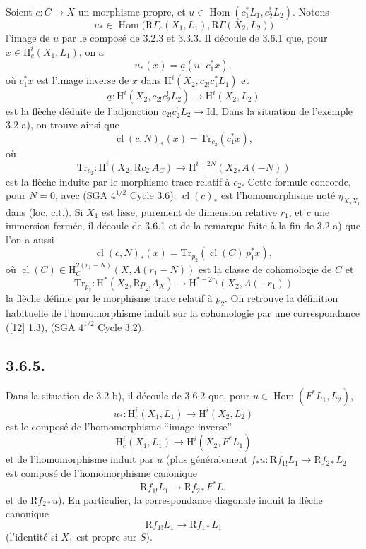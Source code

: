 \documentclass[11pt]{article}
\renewcommand{\H}{\mathrm{H}}
\DeclareMathOperator{\Hom}{Hom}
\newcommand{\R}{\mathrm{R}}\newcommand{\RHomCore}{\mathrm{RHom}}
\providecommand{\Id}{\mathrm{Id}}
\providecommand{\Hom}{\operatorname{Hom}}
\providecommand{\R}{\mathrm R}
\providecommand{\Hom}{\operatorname{Hom}}
\begin{document}
Soient $c:C\to X$ un morphisme propre, et $u\in\Hom(c_1^*L_1,c_2^!L_2)$. Notons
\[
u_*\in\Hom\bigl(\R\Gamma_c(X_1,L_1),\R\Gamma(X_2,L_2)\bigr)
\]
l'image de $u$ par le composé de 3.2.3 et 3.3.3. Il découle de 3.6.1 que, pour $x\in\H_c^i(X_1,L_1)$, on a
\begin{equation}
u_*(x)=\underline{a}(u\cdot c_1^*x),
\tag{3.6.2}
\end{equation}
où $c_1^*x$ est l'image inverse de $x$ dans $\H^i(X_2,c_{2!}c_1^*L_1)$ et
\[
\underline{a}:\H^i(X_2,c_{2!}c_2^!L_2)\longrightarrow \H^i(X_2,L_2)
\]
est la flèche déduite de l'adjonction $c_{2!}c_2^!L_2\to\Id$. Dans la situation de l'exemple 3.2 a), on trouve ainsi que
\begin{equation}
\operatorname{cl}(c,N)_*(x)=\mathrm{Tr}_{c_2}(c_1^*x),
\tag{3.6.3}
\end{equation}
où
\[
\mathrm{Tr}_{c_2}:\H^i(X_2,\R c_{2!}A_C)\longrightarrow\H^{i-2N}(X_2,A(-N))
\]
est la flèche
induite par le morphisme trace relatif à $c_2$. Cette formule concorde, pour $N=0$, avec (SGA $4^{1/2}$ Cycle 3.6): $\operatorname{cl}(c)_*$ est l'homomorphisme noté $\eta_{X_2X_1}$ dans (loc. cit.). Si $X_1$ est lisse, purement de dimension relative $r_1$, et $c$ une immersion fermée, il découle de 3.6.1 et de la remarque faite à la fin de 3.2 a) que l'on a aussi
\begin{equation}
\operatorname{cl}(c,N)_*(x)=\mathrm{Tr}_{p_2}(\operatorname{cl}(C)\,p_1^*x),
\tag{3.6.4}
\end{equation}
où $\operatorname{cl}(C)\in \H_C^{2(r_1-N)}(X,A(r_1-N))$ est la classe de cohomologie de $C$ et
\[
\mathrm{Tr}_{p_2}:\H^*(X_2,\R p_{2!}A_X)\longrightarrow \H^{*-2r_1}(X_2,A(-r_1))
\]
la flèche définie par le morphisme trace relatif à $p_2$. On retrouve la définition habituelle de l'homomorphisme induit sur la cohomologie par une correspondance ([12] 1.3), (SGA $4^{1/2}$ Cycle 3.2).

\subsection*{3.6.5.}
Dans la situation de 3.2 b), il découle de 3.6.2 que, pour $u\in\Hom(F^*L_1,L_2)$,
\[
u_*:\H_c^i(X_1,L_1)\longrightarrow \H^i(X_2,L_2)
\]
est le composé de l'homomorphisme ``image inverse''
\[
\H_c^i(X_1,L_1)\longrightarrow \H^i(X_2,F^*L_1)
\]
et de l'homomorphisme induit par $u$ (plus généralement $f_*u:\R f_{1!}L_1\to \R f_{2*}L_2$ est composé de l'homomorphisme canonique
\[
\R f_{1!}L_1\longrightarrow \R f_{2*}F^*L_1
\]
et de $\R f_{2*}u$). En particulier, la correspondance diagonale induit la flèche canonique
\[
\R f_{1!}L_1\longrightarrow \R f_{1*}L_1
\]
(l'identité si $X_1$ est propre sur $S$).
\end{document}
